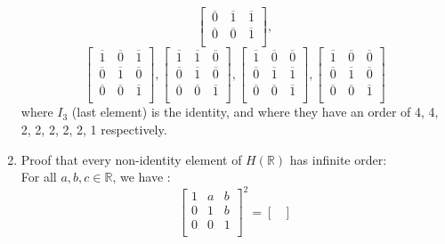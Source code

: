 \documentclass[12pt]{article}
\newcommand{\R}{\mathbb{R}}
\newcommand{\olsi}[1]{\,\overline{\!{#1}}}
\begin{document}
\begin{enumerate}[label=\textbf{\alph*.}]
\[\begin{bmatrix}
                \olsi{0} & \olsi{1} & \olsi{1} \\
                \olsi{0} & \olsi{0} & \olsi{1} \\
            \end{bmatrix}, \]
            \[ \begin{bmatrix}
                \olsi{1} & \olsi{0} & \olsi{1} \\
                \olsi{0} & \olsi{1} & \olsi{0} \\
                \olsi{0} & \olsi{0} & \olsi{1} \\
            \end{bmatrix},
            \begin{bmatrix}
                \olsi{1} & \olsi{1} & \olsi{0} \\
                \olsi{0} & \olsi{1} & \olsi{0} \\
                \olsi{0} & \olsi{0} & \olsi{1} \\
            \end{bmatrix},
            \begin{bmatrix}
                \olsi{1} & \olsi{0} & \olsi{0} \\
                \olsi{0} & \olsi{1} & \olsi{1} \\
                \olsi{0} & \olsi{0} & \olsi{1} \\
            \end{bmatrix},
            \begin{bmatrix}
                \olsi{1} & \olsi{0} & \olsi{0} \\
                \olsi{0} & \olsi{1} & \olsi{0} \\
                \olsi{0} & \olsi{0} & \olsi{1} \\
            \end{bmatrix} \]
            where $I_3$ (last element) is the identity, and where they
            have an order of 4, 4, 2, 2, 2, 2, 2, 1 respectively.
        \item
            Proof that every non-identity element of $H(\R)$ has infinite
            order: \\
            For all $a, b, c \in \R$, we have :
            \[ \begin{bmatrix}
                1 & a & b \\
                0 & 1 & b \\
                0 & 0 & 1 \\
            \end{bmatrix}^2
            = \begin{bmatrix}

\end{bmatrix}\]
\end{enumerate}
\end{document}
